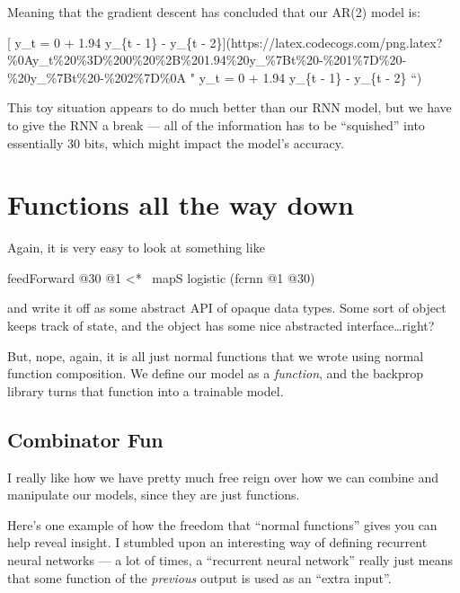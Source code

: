 \documentclass[]{article}
\newenvironment{Shaded}{}{}
\newcommand{\DecValTok}[1]{\textcolor[rgb]{0.25,0.63,0.44}{#1}}
\newcommand{\FunctionTok}[1]{\textcolor[rgb]{0.02,0.16,0.49}{#1}}
\newcommand{\NormalTok}[1]{#1}
\begin{document}
Meaning that the gradient descent has concluded that our AR(2) model is:

{[} y\_t = 0 + 1.94 y\_\{t - 1\} - y\_\{t -
2\}{]}(https://latex.codecogs.com/png.latex?\%0Ay\_t\%20\%3D\%200\%20\%2B\%201.94\%20y\_\%7Bt\%20-\%201\%7D\%20-\%20y\_\%7Bt\%20-\%202\%7D\%0A
" y\_t = 0 + 1.94 y\_\{t - 1\} - y\_\{t - 2\} ``)

This toy situation appears to do much better than our RNN model, but we have to
give the RNN a break --- all of the information has to be ``squished'' into
essentially 30 bits, which might impact the model's accuracy.

\hypertarget{functions-all-the-way-down}{%
\section{Functions all the way down}\label{functions-all-the-way-down}}

Again, it is very easy to look at something like

\begin{Shaded}
\begin{Highlighting}[]
\NormalTok{feedForward }\FunctionTok{@}\DecValTok{30} \FunctionTok{@}\DecValTok{1} \FunctionTok{<*~}\NormalTok{ mapS logistic (fcrnn }\FunctionTok{@}\DecValTok{1} \FunctionTok{@}\DecValTok{30}\NormalTok{)}
\end{Highlighting}
\end{Shaded}

and write it off as some abstract API of opaque data types. Some sort of object
keeps track of state, and the object has some nice abstracted
interface\ldots{}right?

But, nope, again, it is all just normal functions that we wrote using normal
function composition. We define our model as a \emph{function}, and the backprop
library turns that function into a trainable model.

\hypertarget{combinator-fun}{%
\subsection{Combinator Fun}\label{combinator-fun}}

I really like how we have pretty much free reign over how we can combine and
manipulate our models, since they are just functions.

Here's one example of how the freedom that ``normal functions'' gives you can
help reveal insight. I stumbled upon an interesting way of defining recurrent
neural networks --- a lot of times, a ``recurrent neural network'' really just
means that some function of the \emph{previous} output is used as an ``extra
input''.
\end{document}
